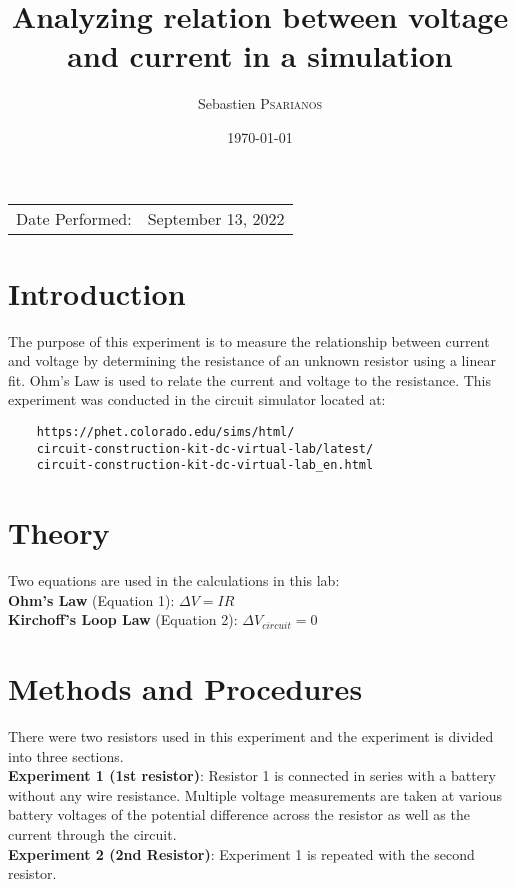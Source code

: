 \documentclass[
	letterpaper, %
	12pt, %
]{CSUniSchoolLabReport}
\title{Analyzing relation between voltage and current in a simulation}
\author{Sebastien \textsc{Psarianos}}
\date{\today}
\begin{document}
\maketitle

\begin{center}
	\begin{tabular}{l r}
		Date Performed: & September 13, 2022 \\
	\end{tabular}
\end{center}


\section{Introduction}
The purpose of this experiment is to measure the relationship between current and voltage by determining the resistance of an unknown resistor using a linear fit. Ohm's Law is used to relate the current and voltage to the resistance. This experiment was conducted in the circuit simulator located at:
\begin{verbatim}
	https://phet.colorado.edu/sims/html/
	circuit-construction-kit-dc-virtual-lab/latest/
	circuit-construction-kit-dc-virtual-lab_en.html
\end{verbatim}
\section{Theory}
Two equations are used in the calculations in this lab:\\
\textbf{Ohm's Law} (Equation 1): $\Delta V = IR$\\
\textbf{Kirchoff's Loop Law} (Equation 2): $\Delta V_{circuit} = 0$


\section{Methods and Procedures}
There were two resistors used in this experiment and the experiment is divided into three sections.\\

\textbf{Experiment 1 (1st resistor)}: Resistor 1 is connected in series with a battery without any wire resistance. Multiple voltage measurements are taken at various battery voltages of the potential difference across the resistor as well as the current through the circuit.\\

\textbf{Experiment 2 (2nd Resistor)}: Experiment 1 is repeated with the second resistor.\\
\end{document}
